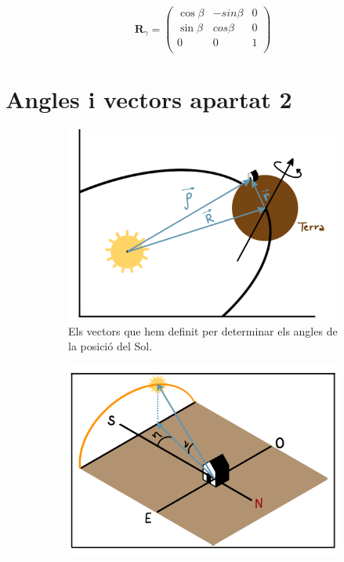 \documentclass[11pt]{article}
\begin{document}
\begin{equation}
    \mathbf{R}_{\gamma}=
    \begin{pmatrix}
       \cos\beta& -sin\beta& 0 \\
       \sin\beta & cos\beta &0\\
      0 & 0 & 1  \\
    \end{pmatrix}
\end{equation}  


\section{Angles i vectors apartat 2}
\begin{figure}[hbt]
    \centering
    \begin{subfigure}{0.5\textwidth}
        \centering
        \includegraphics[width=\textwidth]{vectors.PNG}
        \caption{Els vectors que hem definit per determinar els angles de la posició del Sol.}
        \label{fig: sist_vectors}
    \end{subfigure}%
    \hspace{0.000001\textwidth}%
    \begin{subfigure}{0.5\textwidth}
        \centering
        \includegraphics[width=\textwidth]{ang_sol.PNG}

\end{subfigure}
\end{figure}
\end{document}
